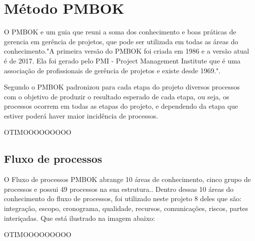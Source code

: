 \section{Método PMBOK }
O PMBOK e um guia que reuni a soma dos conhecimento e boas práticas de gerencia em gerência de projetos, que pode ser utilizada em todas as áreas do conhecimento."A primeira versão do PMBOK foi criada em 1986 e a versão atual é de 2017. Ela foi gerado pelo PMI - Project Management Institute que é uma associação de profissionais de gerência de projetos e existe desde 1969."\cite{machado2001gerencia}.

Segundo \cite{maciel2006metodo} o PMBOK padronizou para cada etapa do projeto diversos processos com o objetivo de produzir o resultado esperado de cada etapa, ou seja, os processos ocorrem em todas as etapas do projeto, e dependendo da etapa que estiver poderá haver maior incidência de processos. 

{\color{red} OTIMOOOOOOOOO}

\subsection{Fluxo de processos}

 O Fluxo de processos PMBOK abrange 10 áreas de conhecimento, cinco grupo de processos e possui 49 processos na sua estrutura.\cite{borja2019aplicaccao}. Dentro dessas 10 áreas do conhecimento do fluxo de processos, foi utilizado neste projeto 8 deles que são: integração, escopo, cronograma, qualidade, recursos, comunicações, riscos, partes interiçadas. Que está ilustrado na imagem abaixo:
 
 {\color{red} OTIMOOOOOOOOO}

